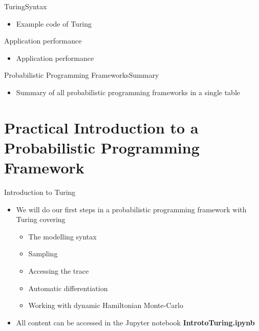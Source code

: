 \documentclass[AERbeamer%
              ,optEnglish%
              ,optBiber%
              ,optBibstyleAlphabetic%
              ,optBeamerClassicFormat%
              ]{AERlatex}%
\begin{document}
\begin{frame}[c]{Turing}{Syntax}
    \centering
    \begin{itemize}
        \item Example code of Turing
    \end{itemize}
\end{frame}


\begin{frame}[c]{Application performance}
    \centering
    \begin{itemize}
        \item Application performance
    \end{itemize}
\end{frame}


\begin{frame}[c]{Probabilistic Programming Frameworks}{Summary}
    \centering
    \begin{itemize}
        \item Summary of all probabilistic programming frameworks in a single table
    \end{itemize}
\end{frame}



\section{Practical Introduction to a Probabilistic Programming Framework}


\begin{frame}[c]{Introduction to Turing}
    \centering
    \begin{itemize}
        \item We will do our first steps in a probabilistic programming framework with Turing covering
        \begin{itemize}
            \item The modelling syntax
            \item Sampling
            \item Accessing the trace
            \item Automatic differentiation
            \item Working with dynamic Hamiltonian Monte-Carlo
        \end{itemize}
        \item All content can be accessed in the Jupyter notebook \textbf{IntrotoTuring.ipynb}
    \end{itemize}
\end{frame}
\end{document}
